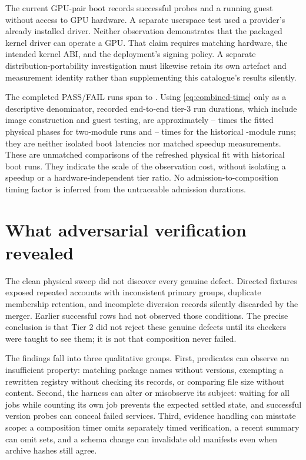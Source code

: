 The current GPU-pair boot records successful probes and a running guest without access to GPU hardware. A separate userspace test used a provider's already installed driver. Neither observation demonstrates that the packaged kernel driver can operate a GPU. That claim requires matching hardware, the intended kernel \ac{ABI}, and the deployment's signing policy. A separate distribution-portability investigation must likewise retain its own artefact and measurement identity rather than supplementing this catalogue's results silently.

The  completed PASS/FAIL runs span  to . Using \cref{eq:combined-time} only as a descriptive denominator, recorded end-to-end tier-3 run durations, which include image construction and guest testing, are approximately -- times the fitted physical phases for two-module runs and -- times for the historical -module runs; they are neither isolated boot latencies nor matched speedup measurements. These are unmatched comparisons of the refreshed physical fit with historical boot runs. They indicate the scale of the observation cost, without isolating a speedup or a hardware-independent tier ratio. No admission-to-composition timing factor is inferred from the untraceable admission durations.

\section{What adversarial verification revealed}

The clean physical sweep did not discover every genuine defect. Directed fixtures exposed repeated accounts with inconsistent primary groups, duplicate membership retention, and incomplete diversion records silently discarded by the merger. Earlier successful rows had not observed those conditions. The precise conclusion is that Tier \num{2} did not reject these genuine defects until its checkers were taught to see them; it is not that composition never failed.

The findings fall into three qualitative groups. First, predicates can observe an insufficient property: matching package names without versions, exempting a rewritten registry without checking its records, or comparing file size without content. Second, the harness can alter or misobserve its subject: waiting for all jobs while counting its own job prevents the expected settled state, and successful version probes can conceal failed services. Third, evidence handling can misstate scope: a composition timer omits separately timed verification, a recent summary can omit sets, and a schema change can invalidate old manifests even when archive hashes still agree.

